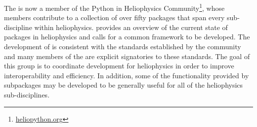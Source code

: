 The \sunpyproj is now a member of the Python in Heliophysics Community\footnote{\url{heliopython.org}}, whose members contribute to a collection of over fifty \python packages that span every sub-discipline within heliophysics.
\citet{snakes} provides an overview of the current state of \python packages in heliophysics and calls for a common framework to be developed.
The development of \sunpypkg is consistent with the standards established by the community \citep{pyhcStandards} and many members of the \sunpyproj are explicit signatories to these standards.
The goal of this group is to coordinate \python development for heliophysics in order to improve interoperability and efficiency.
In addition, some of the functionality provided by \sunpypkg subpackages may be developed to be generally useful for all of the heliophysics sub-disciplines.
